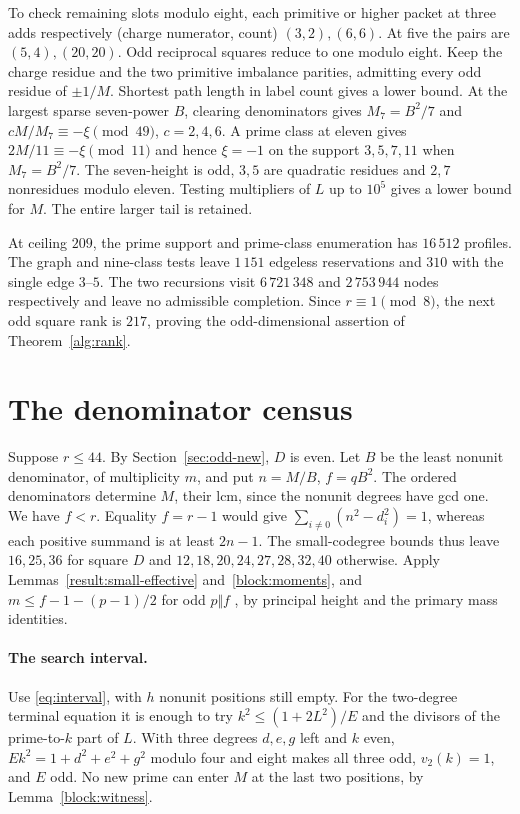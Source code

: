 \documentclass[11pt]{amsart}
\numberwithin{equation}{section}
\theoremstyle{definition}
\theoremstyle{plain}
\begin{document}
To check remaining slots modulo eight, each primitive or higher packet
at three adds respectively (charge numerator, count) $(3,2),(6,6)$.
At five the pairs are $(5,4),(20,20)$. Odd reciprocal squares reduce
to one modulo eight. Keep the charge residue and the two primitive
imbalance parities, admitting every odd residue of $\pm1/M$. Shortest
path length in label count gives a lower bound. At the largest sparse
seven-power $B$, clearing denominators gives $M_7=B^2/7$ and
$cM/M_7\equiv-\xi\pmod{49}$, $c=2,4,6$. A prime class at eleven gives
$2M/11\equiv-\xi\pmod{11}$ and hence $\xi=-1$ on the support
$3,5,7,11$ when $M_7=B^2/7$. The seven-height is odd, $3,5$ are
quadratic residues and $2,7$ nonresidues modulo eleven. Testing
multipliers of $L$ up to $10^5$ gives a lower bound for $M$. The
entire larger tail is retained.

At ceiling $209$, the prime support and prime-class enumeration has
$16\,512$ profiles. The graph and nine-class tests leave $1\,151$ edgeless
reservations and $310$ with the single edge $3$--$5$. The two recursions
visit $6\,721\,348$ and $2\,753\,944$ nodes respectively and leave no admissible completion. Since $r\equiv1\pmod8$, the next odd
square rank is $217$, proving the odd-dimensional assertion of
Theorem~\ref{alg:rank}.

\section{The denominator census}\label{sec:verify}

Suppose $r\le44$. By Section~\ref{sec:odd-new}, $D$ is even.
Let $B$ be the least nonunit denominator, of multiplicity $m$, and put
$n=M/B$, $f=qB^2$. The ordered denominators determine $M$, their lcm,
since the nonunit degrees have gcd one. We have $f<r$. Equality
$f=r-1$ would give $\sum_{i\ne0}(n^2-d_i^2)=1$, whereas each
positive summand is at least $2n-1$. The small-codegree bounds thus leave
$16,25,36$ for square $D$ and $12,18,20,24,27,28,32,40$ otherwise.
Apply Lemmas~\ref{result:small-effective} and~\ref{block:moments}, and
$m\le f-1-(p-1)/2$ for odd $p\Vert f$
\cite[Proposition~19.9]{BDPcore}, by principal height and the primary mass identities.

\paragraph{The search interval.}
Use \eqref{eq:interval}, with $h$ nonunit positions still empty.
For the two-degree terminal equation it is enough to try
$k^2\le(1+2L^2)/E$ and the divisors of the prime-to-$k$ part of $L$.
With three degrees $d,e,g$ left and $k$ even,
$Ek^2=1+d^2+e^2+g^2$ modulo four and eight makes all three odd,
$v_2(k)=1$, and $E$ odd. No new prime can enter $M$ at the last
two positions, by Lemma~\ref{block:witness}. 
\end{document}
